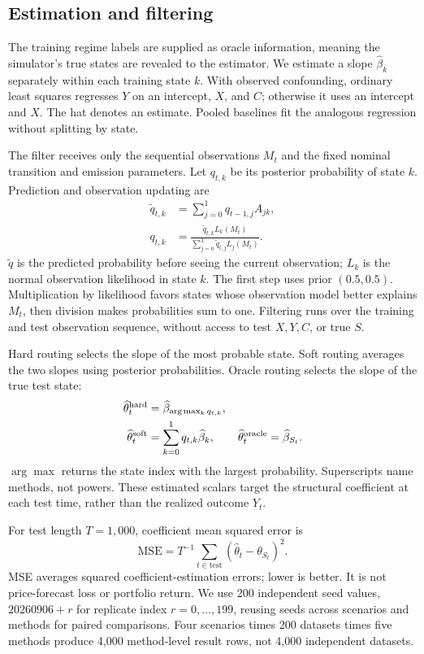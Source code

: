 \subsection{Estimation and filtering}
The training regime labels are supplied as oracle information, meaning the simulator's true states are revealed to the estimator. We estimate a slope $\widehat\beta_k$ separately within each training state $k$. With observed confounding, ordinary least squares regresses $Y$ on an intercept, $X$, and $C$; otherwise it uses an intercept and $X$. The hat denotes an estimate. Pooled baselines fit the analogous regression without splitting by state.

The filter receives only the sequential observations $M_t$ and the fixed nominal transition and emission parameters. Let $q_{t,k}$ be its posterior probability of state $k$. Prediction and observation updating are
\begin{align}
 \widetilde q_{t,k}&=\sum_{j=0}^1q_{t-1,j}A_{jk},\\
 q_{t,k}&=\frac{\widetilde q_{t,k}L_k(M_t)}{\sum_{j=0}^1\widetilde q_{t,j}L_j(M_t)}.
\end{align}
$\widetilde q$ is the predicted probability before seeing the current observation; $L_k$ is the normal observation likelihood in state $k$. The first step uses prior $(0.5,0.5)$. Multiplication by likelihood favors states whose observation model better explains $M_t$, then division makes probabilities sum to one. Filtering runs over the training and test observation sequence, without access to test $X,Y,C$, or true $S$.

Hard routing selects the slope of the most probable state. Soft routing averages the two slopes using posterior probabilities. Oracle routing selects the slope of the true test state:
\begin{align}
 \widehat\theta^{\rm hard}_t&=\widehat\beta_{\arg\max_k q_{t,k}},\\
 \widehat\theta^{\rm soft}_t&=\sum_{k=0}^1q_{t,k}\widehat\beta_k,\qquad
 \widehat\theta^{\rm oracle}_t=\widehat\beta_{S_t}.
\end{align}
$\arg\max$ returns the state index with the largest probability. Superscripts name methods, not powers. These estimated scalars target the structural coefficient at each test time, rather than the realized outcome $Y_t$.

For test length $T=1{,}000$, coefficient mean squared error is
\begin{equation}
 \mathrm{MSE}=T^{-1}\sum_{t\in\mathrm{test}}
 (\widehat\theta_t-\theta_{S_t})^2.
\end{equation}
MSE averages squared coefficient-estimation errors; lower is better. It is not price-forecast loss or portfolio return. We use 200 independent seed values, $20260906+r$ for replicate index $r=0,\ldots,199$, reusing seeds across scenarios and methods for paired comparisons. Four scenarios times 200 datasets times five methods produce 4,000 method-level result rows, not 4,000 independent datasets.

